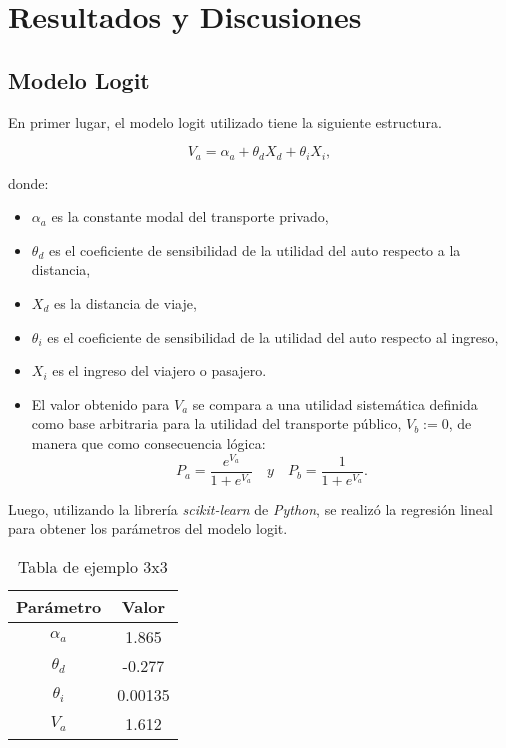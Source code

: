 \section{Resultados y Discusiones}

\subsection{Modelo Logit}

En primer lugar, el modelo logit utilizado tiene la siguiente estructura.

\begin{equation}
    V_a = \alpha_a + \theta_d X_d + \theta_i X_i,
\end{equation}

donde:
\begin{itemize}
    \item $\alpha_a$ es la constante modal del transporte privado,
    \item $\theta_d$ es el coeficiente de sensibilidad de la utilidad del auto respecto a la distancia,
    \item $X_d$ es la distancia de viaje,
    \item $\theta_i$ es el coeficiente de sensibilidad de la utilidad del auto respecto al ingreso,
    \item $X_i$ es el ingreso del viajero o pasajero.
    \item El valor obtenido para $V_a$ se compara a una utilidad sistemática definida como base arbitraria para la utilidad del transporte público, $V_b := 0$, de manera que como consecuencia lógica:
    \begin{equation}
        P_a = \frac{e^{V_a}}{1+e^{V_a}} \quad y \quad P_b = \frac{1}{1+e^{V_a}}.
    \end{equation} 
\end{itemize}
    
Luego, utilizando la librería \textit{scikit-learn} de \textit{Python}, se realizó la regresión lineal para obtener los parámetros del modelo logit.

\begin{table}[H]
    \centering
    \caption{Tabla de ejemplo 3x3}
    \begin{tabular}{|c|c|}
    \hline
    Parámetro & Valor  \\ \hline
    $\alpha_{a}$    & 1.865     \\ \hline
    $\theta_{d}$    & -0.277     \\ \hline
    $\theta_{i}$    & 0.00135     \\ \hline
    $V_{a}$    & 1.612     \\ \hline
    \end{tabular}
\end{table}

